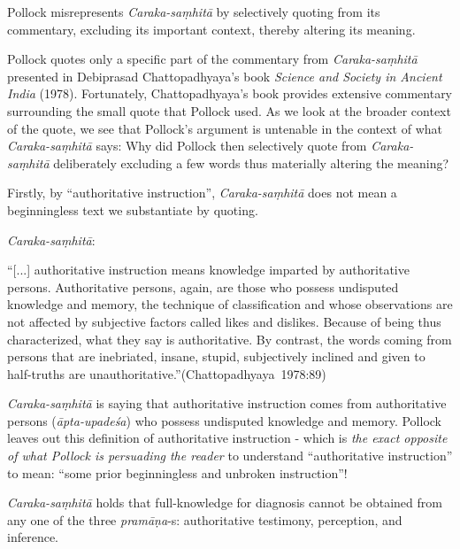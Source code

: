 Pollock misrepresents {{\sl Caraka-saṃhitā}\relax} by selectively quoting from its commentary, excluding its important context, thereby altering its meaning.

Pollock quotes only a specific part of the commentary from {\sl Caraka-saṃhitā} presented in Debiprasad Chattopadhyaya's book {\sl Science and Society in Ancient India} (1978).  Fortunately, Chattopadhyaya's book provides extensive commentary surrounding the small quote that Pollock used. As we look at the broader context of the quote, we see that Pollock's argument is untenable in the context of what {\sl Caraka-saṃhitā} says: Why did Pollock then selectively quote from {\sl Caraka-saṃhitā} deliberately excluding a few words thus materially altering the meaning?

Firstly, by ``authoritative instruction'', {{\sl Caraka-saṃhitā}\relax} does not mean a beginningless text we substantiate by quoting.

{\sl Caraka-saṃhitā}:
\begin{myquote}
``[...] authoritative instruction means knowledge imparted by authoritative persons. Authoritative persons, again, are those who possess undisputed knowledge and memory, the technique of classification and whose observations are not affected by subjective factors called likes and dislikes. Because of being thus characterized, what they say is authoritative.  By contrast, the words coming from persons that are inebriated, insane, stupid, subjectively inclined and given to half-truths are unauthoritative.''\hfill \hbox{(Chattopadhyaya 1978:89)}
\end{myquote}

{\sl Caraka-saṃhitā} is saying that authoritative instruction comes from authoritative persons ({\sl āpta-upadeśa}) who possess undisputed knowledge and memory. Pollock leaves out this definition of authoritative instruction - which is {\sl the exact opposite of what Pollock is persuading the reader} to understand ``authoritative instruction'' to mean: ``some prior beginningless and unbroken instruction''!

{\sl Caraka-saṃhitā} holds that full-knowledge for diagnosis cannot be obtained from any one of the three {\sl pramāṇa}-s: authoritative testimony, perception, and inference.

